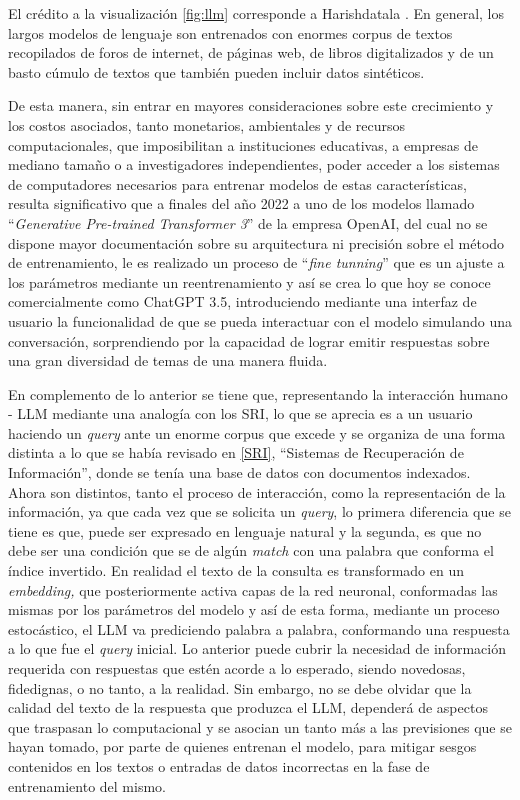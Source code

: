 \documentclass[
  12pt,
  openany]{book}
\begin{document}
El crédito a la visualización \ref{fig:llm} corresponde a Harishdatala \citep{llmsize}. En general, los largos modelos de lenguaje son entrenados con enormes corpus de textos recopilados de foros de internet, de páginas web, de libros digitalizados y de un basto cúmulo de textos que también pueden incluir datos sintéticos.

De esta manera, sin entrar en mayores consideraciones sobre este crecimiento y los costos asociados, tanto monetarios, ambientales y de recursos computacionales, que imposibilitan a instituciones educativas, a empresas de mediano tamaño o a investigadores independientes, poder acceder a los sistemas de computadores necesarios para entrenar modelos de estas características, resulta significativo que a finales del año 2022 a uno de los modelos llamado ``\emph{Generative Pre-trained Transformer 3}'' de la empresa OpenAI, del cual no se dispone mayor documentación sobre su arquitectura ni precisión sobre el método de entrenamiento, le es realizado un proceso de ``\emph{fine tunning}'' que es un ajuste a los parámetros mediante un reentrenamiento y así se crea lo que hoy se conoce comercialmente como ChatGPT 3.5, introduciendo mediante una interfaz de usuario la funcionalidad de que se pueda interactuar con el modelo simulando una conversación, sorprendiendo por la capacidad de lograr emitir respuestas sobre una gran diversidad de temas de una manera fluida.

En complemento de lo anterior se tiene que, representando la interacción humano - LLM mediante una analogía con los SRI, lo que se aprecia es a un usuario haciendo un \emph{query} ante un enorme corpus que excede y se organiza de una forma distinta a lo que se había revisado en \ref{SRI}, ``Sistemas de Recuperación de Información'', donde se tenía una base de datos con documentos indexados. Ahora son distintos, tanto el proceso de interacción, como la representación de la información, ya que cada vez que se solicita un \emph{query}, lo primera diferencia que se tiene es que, puede ser expresado en lenguaje natural y la segunda, es que no debe ser una condición que se de algún \emph{match} con una palabra que conforma el índice invertido. En realidad el texto de la consulta es transformado en un \emph{embedding,} que posteriormente activa capas de la red neuronal, conformadas las mismas por los parámetros del modelo y así de esta forma, mediante un proceso estocástico, el LLM va prediciendo palabra a palabra, conformando una respuesta a lo que fue el \emph{query} inicial. Lo anterior puede cubrir la necesidad de información requerida con respuestas que estén acorde a lo esperado, siendo novedosas, fidedignas, o no tanto, a la realidad. Sin embargo, no se debe olvidar que la calidad del texto de la respuesta que produzca el LLM, dependerá de aspectos que traspasan lo computacional y se asocian un tanto más a las previsiones que se hayan tomado, por parte de quienes entrenan el modelo, para mitigar sesgos contenidos en los textos o entradas de datos incorrectas en la fase de entrenamiento del mismo.
\end{document}
